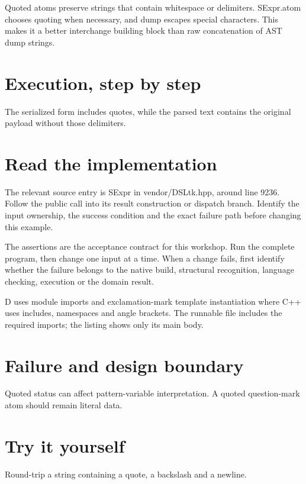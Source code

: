 \clearpage
{}
Quoted atoms preserve strings that contain whitespace or delimiters. SExpr.atom chooses quoting when necessary, and dump escapes special characters. This makes it a better interchange building block than raw concatenation of AST dump strings.


\section*{Execution, step by step}
The serialized form includes quotes, while the parsed text contains the original payload without those delimiters.

\section*{Read the implementation}
The relevant source entry is SExpr in vendor/DSLtk.hpp, around line 9236. Follow the public call into its result construction or dispatch branch. Identify the input ownership, the success condition and the exact failure path before changing this example.

The assertions are the acceptance contract for this workshop. Run the complete program, then change one input at a time. When a change fails, first identify whether the failure belongs to the native build, structural recognition, language checking, execution or the domain result.

\clearpage
{}
D uses module imports and exclamation-mark template instantiation where C++ uses includes, namespaces and angle brackets. The runnable file includes the required imports; the listing shows only its main body.


\section*{Failure and design boundary}
Quoted status can affect pattern-variable interpretation. A quoted question-mark atom should remain literal data.

\section*{Try it yourself}
Round-trip a string containing a quote, a backslash and a newline.

